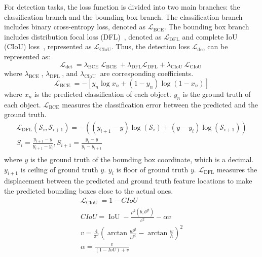\documentclass[lettersize,journal]{IEEEtran}
\begin{document}
For detection tasks, the loss function is divided into two main branches: the classification branch and the bounding box branch. The classification branch includes binary cross-entropy loss, denoted as \( \mathcal{L}_{\text{BCE}} \). The bounding box branch includes distribution focal loss (DFL)~\cite{li2020generalized}, denoted as \( \mathcal{L}_{\text{DFL}} \) and complete IoU (CIoU) loss~\cite{zheng2020distance}, represented as \( \mathcal{L}_{\text{CIoU}} \). Thus, the detection loss $\mathcal{L}_{\text {dec}}$ can be represented as:
\begin{equation}
\mathcal{L}_{\text {det }}=\lambda_{\text {BCE }} \mathcal{L}_{\text {BCE }}+\lambda_{\text {DFL}} \mathcal{L}_{\text {DFL}}+\lambda_{\text {CIoU }} \mathcal{L}_{\text {CIoU }}
\end{equation}
where $\lambda_{\text {BCE }}$, $\lambda_{\text {DFL }}$, and $\lambda_{\text {CIoU }}$ are corresponding coefficients.
\begin{equation}
\mathcal{L}_{\text {BCE }}=-\left[y_n \log x_n+\left(1-y_n\right) \log \left(1-x_n\right)\right]
\end{equation}
where $x_n$ is the predicted classification of each object. $y_n$ is the ground truth of each object. \( \mathcal{L}_{\text{BCE}} \) measures the classification error between the predicted and the ground truth. 
\begin{equation}
\begin{gathered}
\mathcal{L}_{\mathrm{DFL}}\left(\mathcal{S}_i, \mathcal{S}_{i+1}\right)=-\left(\left(y_{i+1}-y\right) \log \left(\mathcal{S}_i\right)+\left(y-y_i\right) \log \left(\mathcal{S}_{i+1}\right)\right)\\
S_i=\frac{y_{i+1}-y}{y_{i+1}-y_i}, S_{i+1}=\frac{y_i-y}{y_i-y_{i+1}}\\
\end{gathered}
\end{equation}
where $y$ is the ground truth of the bounding box coordinate, which is a decimal. $y_{i+1}$ is ceiling of ground truth $y$. $y_{i}$ is floor of ground truth $y$. \( \mathcal{L}_{\text{DFL}} \) measures the displacement between the predicted and ground truth feature locations to make the predicted bounding boxes close to the actual ones.
\begin{equation}
\begin{gathered}
\mathcal{L}_{\text {CIoU }}=1-C I o U\\
C I o U=\operatorname{IoU}-\frac{\rho^2\left(b, b^{g t}\right)}{c^2}-\alpha v \\
v=\frac{4}{\pi^2}\left(\arctan \frac{w^{g t}}{h^{g t}}-\arctan \frac{w}{h}\right)^2 \\
\alpha=\frac{v}{(1-I o U)+v}
\end{gathered}
\end{equation}
\end{document}
